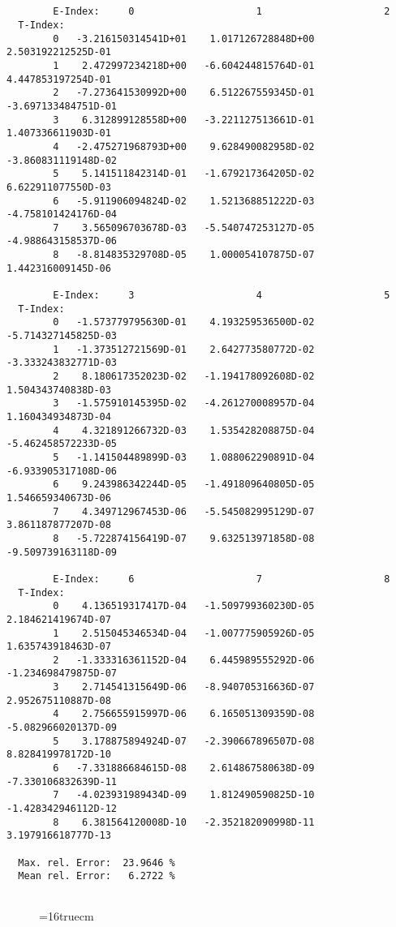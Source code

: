 \documentclass[12pt,dvipdfmx]{article}
\begin{document}
\begin{small}\begin{verbatim}


        E-Index:     0                     1                     2
  T-Index:
        0   -3.216150314541D+01    1.017126728848D+00    2.503192212525D-01
        1    2.472997234218D+00   -6.604244815764D-01    4.447853197254D-01
        2   -7.273641530992D+00    6.512267559345D-01   -3.697133484751D-01
        3    6.312899128558D+00   -3.221127513661D-01    1.407336611903D-01
        4   -2.475271968793D+00    9.628490082958D-02   -3.860831119148D-02
        5    5.141511842314D-01   -1.679217364205D-02    6.622911077550D-03
        6   -5.911906094824D-02    1.521368851222D-03   -4.758101424176D-04
        7    3.565096703678D-03   -5.540747253127D-05   -4.988643158537D-06
        8   -8.814835329708D-05    1.000054107875D-07    1.442316009145D-06

        E-Index:     3                     4                     5
  T-Index:
        0   -1.573779795630D-01    4.193259536500D-02   -5.714327145825D-03
        1   -1.373512721569D-01    2.642773580772D-02   -3.333243832771D-03
        2    8.180617352023D-02   -1.194178092608D-02    1.504343740838D-03
        3   -1.575910145395D-02   -4.261270008957D-04    1.160434934873D-04
        4    4.321891266732D-03    1.535428208875D-04   -5.462458572233D-05
        5   -1.141504489899D-03    1.088062290891D-04   -6.933905317108D-06
        6    9.243986342244D-05   -1.491809640805D-05    1.546659340673D-06
        7    4.349712967453D-06   -5.545082995129D-07    3.861187877207D-08
        8   -5.722874156419D-07    9.632513971858D-08   -9.509739163118D-09

        E-Index:     6                     7                     8
  T-Index:
        0    4.136519317417D-04   -1.509799360230D-05    2.184621419674D-07
        1    2.515045346534D-04   -1.007775905926D-05    1.635743918463D-07
        2   -1.333316361152D-04    6.445989555292D-06   -1.234698479875D-07
        3    2.714541315649D-06   -8.940705316636D-07    2.952675110887D-08
        4    2.756655915997D-06    6.165051309359D-08   -5.082966020137D-09
        5    3.178875894924D-07   -2.390667896507D-08    8.828419978172D-10
        6   -7.331886684615D-08    2.614867580638D-09   -7.330106832639D-11
        7   -4.023931989434D-09    1.812490590825D-10   -1.428342946112D-12
        8    6.381564120008D-10   -2.352182090998D-11    3.197916618777D-13

  Max. rel. Error:  23.9646 %
  Mean rel. Error:   6.2722 %


\end{verbatim}\end{small}
\begin{figure} \label{2.3.2a}
\epsfxsize=16truecm
\end{figure}
\newpage
\end{document}
